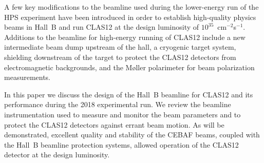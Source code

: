 A few key modifications to the beamline used during the lower-energy run of the HPS experiment
\cite{HPSBeamline} have been introduced in order to establish high-quality physics beams in Hall~B and run
CLAS12 at the design luminosity of $10^{35}$~cm$^{-2}$s$^{-1}$. Additions to the beamline for high-energy
running of CLAS12 include a new intermediate beam dump upstream of the hall, a cryogenic target system,
shielding downstream of the target to protect the CLAS12 detectors from electromagnetic backgrounds, and
the M{\o}ller polarimeter for beam polarization measurements.   

In this paper we discuss the design of the Hall~B beamline for CLAS12 and its performance during the 2018
experimental run. We review the beamline instrumentation used to measure and monitor the beam parameters
and to protect the CLAS12 detectors against errant beam motion. As will be demonstrated, excellent quality and
stability of the CEBAF beams, coupled with the Hall~B beamline protection systems, allowed operation of the
CLAS12 detector at the design luminosity.
